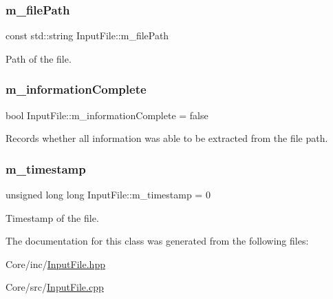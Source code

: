 \mbox{\label{class_input_file_ae3a763e9997cebb9f50aef29499d53c2}} 
\subsubsection{\texorpdfstring{m\+\_\+file\+Path}{m\_filePath}}
{\footnotesize\ttfamily const std\+::string Input\+File\+::m\+\_\+file\+Path\hspace{0.3cm}{\ttfamily [private]}}



Path of the file. 

\mbox{\label{class_input_file_ab4724adf6c3da88760dccc42d6b6401d}} 
\subsubsection{\texorpdfstring{m\+\_\+information\+Complete}{m\_informationComplete}}
{\footnotesize\ttfamily bool Input\+File\+::m\+\_\+information\+Complete = false\hspace{0.3cm}{\ttfamily [private]}}



Records whether all information was able to be extracted from the file path. 

\mbox{\label{class_input_file_a900aea752727f969fa00a8b2727dd4e8}} 
\subsubsection{\texorpdfstring{m\+\_\+timestamp}{m\_timestamp}}
{\footnotesize\ttfamily unsigned long long Input\+File\+::m\+\_\+timestamp = 0\hspace{0.3cm}{\ttfamily [private]}}



Timestamp of the file. 



The documentation for this class was generated from the following files\+:\begin{DoxyCompactItemize}
\item 
Core/inc/\hyperlink{_input_file_8hpp}{Input\+File.\+hpp}\item 
Core/src/\hyperlink{_input_file_8cpp}{Input\+File.\+cpp}\end{DoxyCompactItemize}
